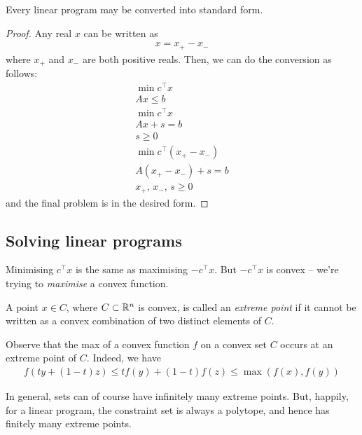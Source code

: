 \documentclass{../../template/note}
\begin{document}
    \begin{proposition}
        Every linear program may be converted into standard form.
    \end{proposition}
    
    \begin{proof}
        Any real $x$ can be written as
        \begin{align*}
            x = x_+ - x_-
        \end{align*}
        where $x_+$ and $x_-$ are both positive reals. Then, we can do the conversion as follows:
        \begin{align*}
            \min c^\intercal x \\
            Ax \leq b \\[10pt]
            \min c^\intercal x \\
            Ax + s = b \\
            s \geq 0 \\[10pt]
            \min c^\intercal (x_+ - x_-) \\
            A(x_+-x_-) + s = b \\
            x_+,\, x_-,\, s \geq 0
        \end{align*}
        and the final problem is in the desired form.       
    \end{proof}

    \subsection{Solving linear programs}

    Minimising $c^\intercal x$ is the same as maximising $-c^\intercal x$. But $-c^\intercal x$ is convex -- we're trying to \emph{maximise} a convex function.
    
    \begin{definition}
        A point $x \in C$, where $C \subset \mathbb R^n$ is convex, is called an \emph{extreme point} if it cannot be written as a convex combination of two distinct elements of $C$.
    \end{definition}
    
    Observe that the max of a convex function $f$ on a convex set $C$ occurs at an extreme point of $C$. Indeed, we have
    \begin{align*}
        f(ty + (1-t)z) \leq tf(y) + (1-t)f(z) \leq \max(f(x), f(y))
    \end{align*}
    
    In general, sets can of course have infinitely many extreme points. But, happily, for a linear program, the constraint set is always a polytope, and hence has finitely many extreme points.
    
\end{document}
